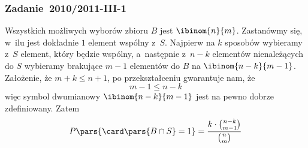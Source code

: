 \subsubsection*{Zadanie~2010/2011-III-1}
Wszystkich możliwych wyborów zbioru \(B\) jest \(\ibinom{n}{m}\). Zastanówmy się, w~ilu jest dokładnie \(1\) element wspólny z~\(S\). Najpierw na \(k\) sposobów wybieramy z~\(S\) element, który będzie wspólny, a~następnie z~\(n - k\) elementów nienależących do \(S\) wybieramy brakujące \(m - 1\) elementów do \(B\) na \(\ibinom{n - k}{m - 1}\). Założenie, że \(m + k \leq n + 1\), po przekształceniu gwarantuje nam, że
\begin{equation*}
    m - 1 \leq n - k
\end{equation*}
więc symbol dwumianowy \(\ibinom{n - k}{m - 1}\) jest na pewno dobrze zdefiniowany. Zatem
\begin{equation*}
    P\pars{\card\pars{B \cap S} = 1}
    = \frac{k \cdot \binom{n - k}{m - 1}}{\binom{n}{m}}
\end{equation*}
